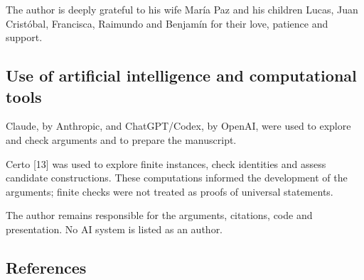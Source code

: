 \documentclass[english,11pt,a4paper]{article}
\begin{document}
The author is deeply grateful to his wife María Paz and his children Lucas, Juan Cristóbal, Francisca, Raimundo and Benjamín for their love, patience and support.

\subsection{Use of artificial intelligence and computational tools}\label{use-of-artificial-intelligence-and-computational-tools}

Claude, by Anthropic, and ChatGPT/Codex, by OpenAI, were used to explore and check arguments and to prepare the manuscript.

Certo {[}13{]} was used to explore finite instances, check identities and assess candidate constructions. These computations informed the development of the arguments; finite checks were not treated as proofs of universal statements.

The author remains responsible for the arguments, citations, code and presentation. No AI system is listed as an author.


\subsection{References}\label{references}

\begingroup\small\raggedright
\end{document}

